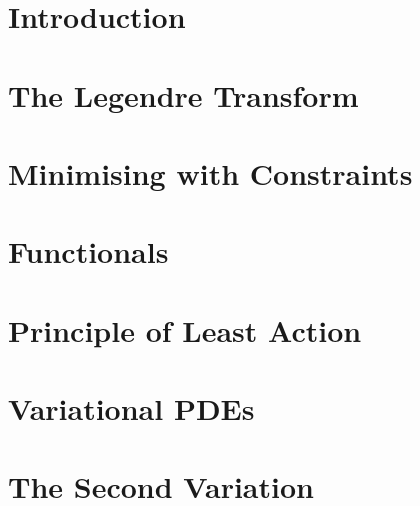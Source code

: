 \documentclass[british,11pt,a4paper]{report}
\begin{document}
\maketitle
\tableofcontents
\chapter{Introduction}

\chapter{The Legendre Transform}

\chapter{Minimising with Constraints}

\chapter{Functionals}

\chapter{Principle of Least Action}

\chapter{Variational PDEs}

\chapter{The Second Variation}

\end{document}
